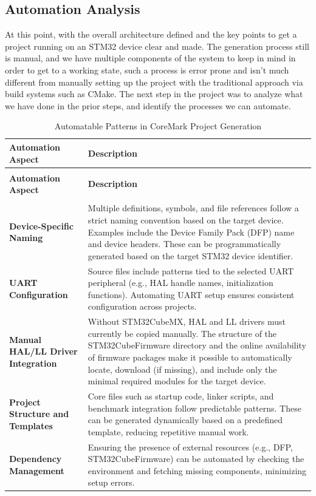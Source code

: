 \subsection{Automation Analysis}
At this point, with the overall architecture defined and the key points to get a project running on an STM32 device clear and made. The generation process still is manual, and we have multiple components of the system to keep in mind in order to get to a working state, such a process is error prone and isn't much different from manually setting up the project with the traditional approach via build systems such as CMake.
The next step in the project was to analyze what we have done in the prior steps, and identify the processes we can automate.
\begin{xltabular}{\linewidth}{@{}>{\bfseries}l X@{}}
	\caption{Automatable Patterns in CoreMark Project Generation\label{tab:auto_patterns}} \\
	\toprule
	\textbf{Automation Aspect} & \textbf{Description} \\
	\midrule
	\endfirsthead %

	 \\
	\toprule
	\textbf{Automation Aspect} & \textbf{Description} \\
	\midrule
	\endhead %

	 \\
	\endfoot %
	\bottomrule
	\endlastfoot %
    Device-Specific Naming & Multiple definitions, symbols, and file references follow a strict naming convention based on the target device. Examples include the Device Family Pack (DFP) name and device headers. These can be programmatically generated based on the target STM32 device identifier. \\
    \midrule
	UART Configuration & Source files include patterns tied to the selected UART peripheral (e.g., HAL handle names, initialization functions). Automating UART setup ensures consistent configuration across projects. \\
    \midrule
	Manual HAL/LL Driver Integration & Without STM32CubeMX, HAL and LL drivers must currently be copied manually. The structure of the STM32CubeFirmware directory and the online availability of firmware packages make it possible to automatically locate, download (if missing), and include only the minimal required modules for the target device. \\
    \midrule
	Project Structure and Templates & Core files such as startup code, linker scripts, and benchmark integration follow predictable patterns. These can be generated dynamically based on a predefined template, reducing repetitive manual work. \\
    \midrule
	Dependency Management & Ensuring the presence of external resources (e.g., DFP, STM32CubeFirmware) can be automated by checking the environment and fetching missing components, minimizing setup errors. \\
\end{xltabular}
